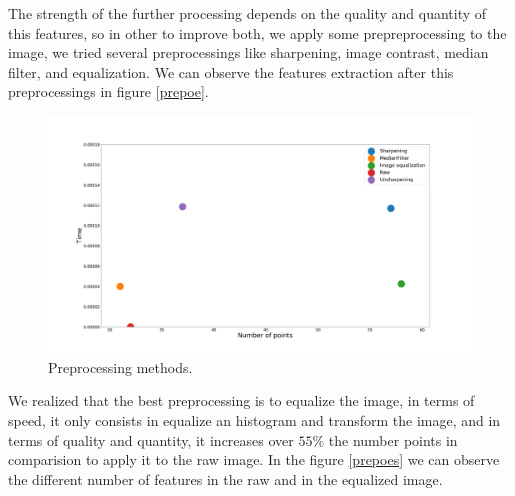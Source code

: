 \documentclass[12pt, a4paper, titlepage,twoside,openright]{article}
\begin{document}
 
The strength of the further processing depends on the quality and quantity of this features, so in other to improve both, we apply some prepreprocessing to the image, we tried several preprocessings like sharpening, image contrast, median filter, and equalization. We can observe the features extraction after this preprocessings in figure \ref{prepoe}.


\begin{figure}[H]
\centering         
\includegraphics[width=0.9\linewidth]{tracker/preprocesing.png}
\caption{Preprocessing methods.} \label{track1w}
\end{figure}

We realized that the best preprocessing is to equalize the image, in terms of speed, it only consists in equalize an histogram and transform the image, and in terms of quality and quantity, it increases over $ 55 \%$ the number points in comparision to apply it to the raw image. In the figure \ref{prepoes} we can observe the different number of features in the raw and in the equalized image.
\end{document}
